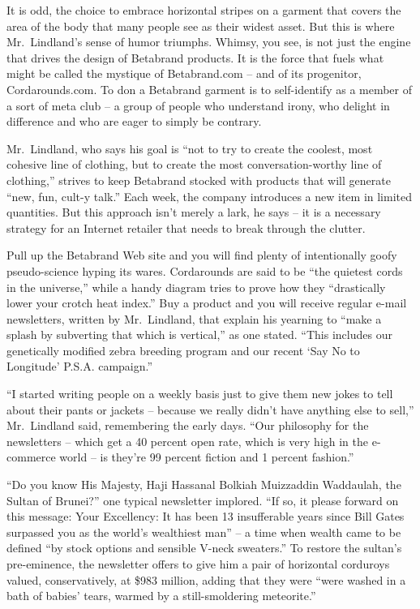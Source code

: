 ﻿\documentclass[12pt]{article}
\begin{document}
It is odd, the choice to embrace horizontal stripes on a garment that covers the area of the body
that many people see as their widest asset. But this is where Mr.~Lindland's sense of humor
triumphs. Whimsy, you see, is not just the engine that drives the design of Betabrand products. It
is the force that fuels what might be called the mystique of Betabrand.com -- and of its progenitor,
Cordarounds.com. To don a Betabrand garment is to self-identify as a member of a sort of meta club
-- a group of people who understand irony, who delight in difference and who are eager to simply be
contrary.

Mr.~Lindland, who says his goal is ``not to try to create the coolest, most cohesive line of
clothing, but to create the most conversation-worthy line of clothing,'' strives to keep Betabrand
stocked with products that will generate ``new, fun, cult-y talk.'' Each week, the company
introduces a new item in limited quantities. But this approach isn't merely a lark, he says -- it is
a necessary strategy for an Internet retailer that needs to break through the clutter.

Pull up the Betabrand Web site and you will find plenty of intentionally goofy pseudo-science hyping
its wares. Cordarounds are said to be ``the quietest cords in the universe,'' while a handy diagram
tries to prove how they ``drastically lower your crotch heat index.'' Buy a product and you will
receive regular e-mail newsletters, written by Mr.~Lindland, that explain his yearning to ``make a
splash by subverting that which is vertical,'' as one stated. ``This includes our genetically
modified zebra breeding program and our recent `Say No to Longitude' P.S.A. campaign.''

``I started writing people on a weekly basis just to give them new jokes to tell about their pants
or jackets -- because we really didn't have anything else to sell,'' Mr.~Lindland said, remembering
the early days. ``Our philosophy for the newsletters -- which get a 40 percent open rate, which is
very high in the e-commerce world -- is they're 99 percent fiction and 1 percent fashion.''

``Do you know His Majesty, Haji Hassanal Bolkiah Muizzaddin Waddaulah, the Sultan of Brunei?'' one
typical newsletter implored. ``If so, it please forward on this message: Your Excellency: It has
been 13 insufferable years since Bill Gates surpassed you as the world's wealthiest man'' -- a time
when wealth came to be defined ``by stock options and sensible V-neck sweaters.'' To restore the
sultan's pre-eminence, the newsletter offers to give him a pair of horizontal corduroys valued,
conservatively, at \$983 million, adding that they were ``were washed in a bath of babies' tears,
warmed by a still-smoldering meteorite.''
\end{document}
